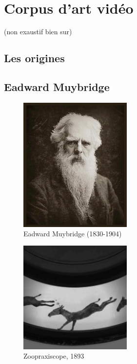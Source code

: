 \documentclass[
  french,
]{book}
\begin{document}
\hypertarget{corpus}{%
\chapter{Corpus d'art vidéo}\label{corpus}}

(non exaustif bien sur)

\hypertarget{les-origines}{%
\section{Les origines}\label{les-origines}}

\hypertarget{eadward-muybridge}{%
\section{Eadward Muybridge}\label{eadward-muybridge}}

\begin{figure}
\centering
\includegraphics[width=0.5\textwidth,height=\textheight]{medias/corpus/muybridge/Optic_Projection_fig_411.jpg}
\caption{Eadward Muybridge (1830-1904)}
\end{figure}

\begin{figure}
\centering
\includegraphics[width=0.5\textwidth,height=\textheight]{medias/corpus/muybridge/Zoopraxiscope_16485d.gif}
\caption{Zoopraxiscope, 1893}
\end{figure}
\end{document}
